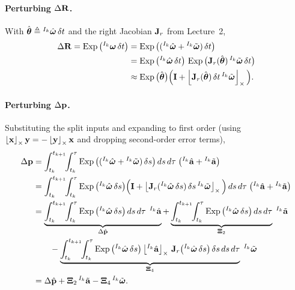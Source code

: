 \paragraph{Perturbing $\Delta\boldsymbol{\mathbf{R}}$.} With $\hat{\boldsymbol{\mathbf{\theta}}} \triangleq {}^{I_k}\hat{\boldsymbol{\mathbf{\omega}}}\,\delta t$ and the right Jacobian $\boldsymbol{\mathbf{J}}_r$ from Lecture~2,
\begin{align}
\Delta\boldsymbol{\mathbf{R}} = \operatorname{Exp}\big({}^{I_k}\boldsymbol{\mathbf{\omega}}\,\delta t\big)
&= \operatorname{Exp}\big(({}^{I_k}\hat{\boldsymbol{\mathbf{\omega}}} + {}^{I_k}\tilde{\boldsymbol{\mathbf{\omega}}})\,\delta t\big) \\
&= \operatorname{Exp}\big({}^{I_k}\hat{\boldsymbol{\mathbf{\omega}}}\,\delta t\big)\,\operatorname{Exp}\big(\boldsymbol{\mathbf{J}}_r(\hat{\boldsymbol{\mathbf{\theta}}})\,{}^{I_k}\tilde{\boldsymbol{\mathbf{\omega}}}\,\delta t\big) \\
&\approx \operatorname{Exp}\big(\hat{\boldsymbol{\mathbf{\theta}}}\big)\Big(\boldsymbol{\mathbf{I}} + \left\lfloor\boldsymbol{\mathbf{J}}_r(\hat{\boldsymbol{\mathbf{\theta}}})\,\delta t\,{}^{I_k}\tilde{\boldsymbol{\mathbf{\omega}}}\right\rfloor_{\times}\Big).
\end{align}

\paragraph{Perturbing $\Delta\boldsymbol{\mathbf{p}}$.} Substituting the split inputs and expanding to first order (using $\left\lfloor\boldsymbol{\mathbf{x}}\right\rfloor_{\times}\boldsymbol{\mathbf{y}} = -\left\lfloor\boldsymbol{\mathbf{y}}\right\rfloor_{\times}\boldsymbol{\mathbf{x}}$ and dropping second-order error terms),
\begin{align}
\Delta\vect{p}
&= \int_{t_k}^{t_{k+1}}\!\!\int_{t_k}^{\tau} \Exp\big(({}^{I_k}\hat{\vect{\omega}} + {}^{I_k}\tilde{\vect{\omega}})\,\delta s\big)\,ds\,d\tau\;\big({}^{I_k}\hat{\vect{a}} + {}^{I_k}\tilde{\vect{a}}\big) \\
&= \int_{t_k}^{t_{k+1}}\!\!\int_{t_k}^{\tau} \Exp\big({}^{I_k}\hat{\vect{\omega}}\,\delta s\big)\Big(\vect{I} + \skewsym{\vect{J}_r({}^{I_k}\hat{\vect{\omega}}\,\delta s)\,\delta s\,{}^{I_k}\tilde{\vect{\omega}}}\Big)\,ds\,d\tau\;\big({}^{I_k}\hat{\vect{a}} + {}^{I_k}\tilde{\vect{a}}\big) \\
&= \underbrace{\int_{t_k}^{t_{k+1}}\!\!\int_{t_k}^{\tau} \Exp\big({}^{I_k}\hat{\vect{\omega}}\,\delta s\big)\,ds\,d\tau\,\;{}^{I_k}\hat{\vect{a}}}_{\Delta\hat{\vect{p}}}
+ \underbrace{\int_{t_k}^{t_{k+1}}\!\!\int_{t_k}^{\tau} \Exp\big({}^{I_k}\hat{\vect{\omega}}\,\delta s\big)\,ds\,d\tau}_{\vect{\Xi}_2}\;{}^{I_k}\tilde{\vect{a}} \notag\\
&\qquad - \underbrace{\int_{t_k}^{t_{k+1}}\!\!\int_{t_k}^{\tau} \Exp\big({}^{I_k}\hat{\vect{\omega}}\,\delta s\big)\skewsym{{}^{I_k}\hat{\vect{a}}}\,\vect{J}_r\big({}^{I_k}\hat{\vect{\omega}}\,\delta s\big)\,\delta s\,ds\,d\tau}_{\vect{\Xi}_4}\;{}^{I_k}\tilde{\vect{\omega}} \\
&= \Delta\hat{\vect{p}} + \vect{\Xi}_2\,{}^{I_k}\tilde{\vect{a}} - \vect{\Xi}_4\,{}^{I_k}\tilde{\vect{\omega}}.
\end{align}

